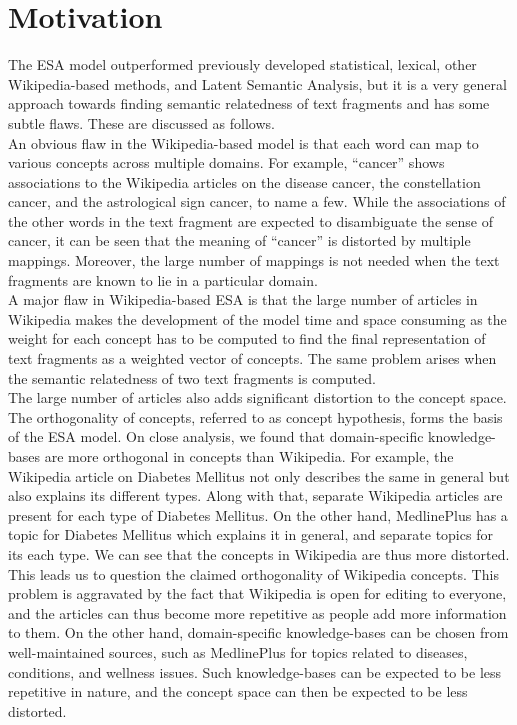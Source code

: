 \documentclass[journal,transmag]{IEEEtran}
\begin{document}
\section{\textbf{Motivation}}
The ESA model outperformed previously developed statistical, lexical, other Wikipedia-based methods, and Latent Semantic Analysis, but it is a very general approach towards finding semantic relatedness of text fragments and has some subtle flaws. These are discussed as follows.\\
An obvious flaw in the Wikipedia-based model is that each word can map to various concepts across multiple domains. For example, ``cancer'' shows associations to the Wikipedia articles on the disease cancer, the constellation cancer, and the astrological sign cancer, to name a few. While the associations of the other words in the text fragment are expected to disambiguate the sense of cancer, it can be seen that the meaning of ``cancer'' is distorted by multiple mappings. Moreover, the large number of mappings is not needed when the text fragments are known to lie in a particular domain.\\
A major flaw in Wikipedia-based ESA is that the large number of articles in Wikipedia makes the development of the model time and space consuming as the weight for each concept has to be computed to find the final representation of text fragments as a weighted vector of concepts. The same problem arises when the semantic relatedness of two text fragments is computed.\\
The large number of articles also adds significant distortion to the concept space. The orthogonality of concepts, referred to as concept hypothesis, forms the basis of the ESA model. On close analysis, we found that domain-specific knowledge-bases are more orthogonal in concepts than Wikipedia. For example, the Wikipedia article on Diabetes Mellitus not only describes the same in general but also explains its different types. Along with that, separate Wikipedia articles are present for each type of Diabetes Mellitus. On the other hand, MedlinePlus has a topic for Diabetes Mellitus which explains it in general, and separate topics for its each type. We can see that the concepts in Wikipedia are thus more distorted. This leads us to question the claimed orthogonality of Wikipedia concepts. This problem is aggravated by the fact that Wikipedia is open for editing to everyone, and the articles can thus become more repetitive as people add more information to them. On the other hand, domain-specific knowledge-bases can be chosen from well-maintained sources, such as MedlinePlus for topics related to diseases, conditions, and wellness issues. Such knowledge-bases can be expected to be less repetitive in nature, and the concept space can then be expected to be less distorted.\\
\end{document}
